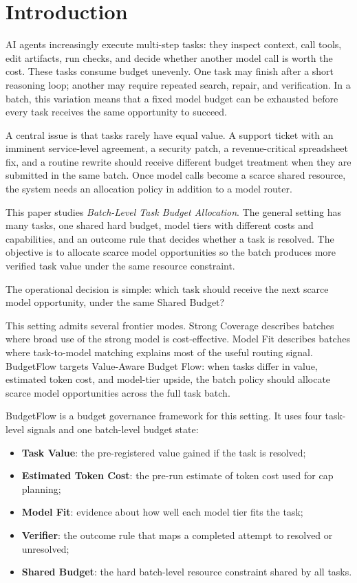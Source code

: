 \documentclass{article}
\newcommand{\method}{BudgetFlow\xspace}
\newcommand{\taskvalue}{Task Value\xspace}
\newcommand{\tokencost}{Estimated Token Cost\xspace}
\newcommand{\modelfit}{Model Fit\xspace}
\newcommand{\sharedbudget}{Shared Budget\xspace}
\newcommand{\verifier}{Verifier\xspace}
\begin{document}
\section{Introduction}
AI agents increasingly execute multi-step tasks: they inspect context, call tools, edit artifacts, run checks, and decide whether another model call is worth the cost. These tasks consume budget unevenly. One task may finish after a short reasoning loop; another may require repeated search, repair, and verification. In a batch, this variation means that a fixed model budget can be exhausted before every task receives the same opportunity to succeed.

A central issue is that tasks rarely have equal value. A support ticket with an imminent service-level agreement, a security patch, a revenue-critical spreadsheet fix, and a routine rewrite should receive different budget treatment when they are submitted in the same batch. Once model calls become a scarce shared resource, the system needs an allocation policy in addition to a model router.

This paper studies \emph{Batch-Level Task Budget Allocation}. The general setting has many tasks, one shared hard budget, model tiers with different costs and capabilities, and an outcome rule that decides whether a task is resolved. The objective is to allocate scarce model opportunities so the batch produces more verified task value under the same resource constraint.

The operational decision is simple: which task should receive the next scarce model opportunity, under the same \sharedbudget?

This setting admits several frontier modes. Strong Coverage describes batches where broad use of the strong model is cost-effective. Model Fit describes batches where task-to-model matching explains most of the useful routing signal. \method targets Value-Aware Budget Flow: when tasks differ in value, estimated token cost, and model-tier upside, the batch policy should allocate scarce model opportunities across the full task batch.

\method is a budget governance framework for this setting. It uses four task-level signals and one batch-level budget state:

\begin{itemize}
    \item \textbf{\taskvalue}: the pre-registered value gained if the task is resolved;
    \item \textbf{\tokencost}: the pre-run estimate of token cost used for cap planning;
    \item \textbf{\modelfit}: evidence about how well each model tier fits the task;
    \item \textbf{\verifier}: the outcome rule that maps a completed attempt to resolved or unresolved;
    \item \textbf{\sharedbudget}: the hard batch-level resource constraint shared by all tasks.
\end{itemize}
\end{document}
